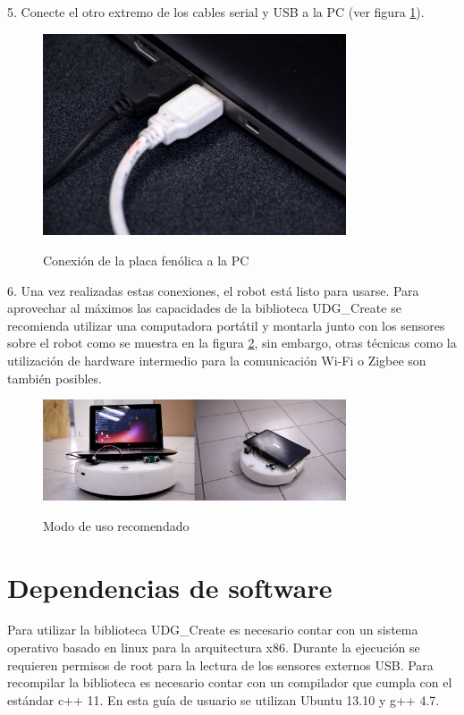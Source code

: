 \documentclass[letterpaper,openright,12pt]{book}
\begin{document}
5. Conecte el otro extremo de los cables serial y USB a la PC (ver figura \ref{fig:computerCables}).\\
\begin{figure}
\begin{center}
\includegraphics[width=0.8\textwidth]{figures/computerCables.jpg}
\caption{Conexión de la placa fenólica a la PC}
\centering
\label{fig:computerCables}
\end{center}
\end{figure} 
6. Una vez realizadas estas conexiones, el robot está listo para usarse. Para aprovechar al máximos las capacidades de la biblioteca UDG\_Create se recomienda utilizar una computadora portátil y montarla junto con los sensores sobre el robot como se muestra en la figura \ref{fig:usage}, sin embargo, otras técnicas como la utilización de hardware intermedio para la comunicación Wi-Fi o Zigbee son también posibles.
\begin{figure}
\begin{center}
\includegraphics[width=0.8\textwidth]{figures/usage.jpg}
\caption{Modo de uso recomendado}
\centering
\label{fig:usage}
\end{center}
\end{figure} 
\section{Dependencias de software}
Para utilizar la biblioteca UDG\_Create es necesario contar con un sistema operativo basado en linux para la arquitectura x86. Durante la ejecución se requieren permisos de root para la lectura de los sensores externos USB. Para recompilar la biblioteca es necesario contar con un compilador que cumpla con el estándar c++ 11. En esta guía de usuario se utilizan Ubuntu 13.10 y g++ 4.7.
\end{document}
